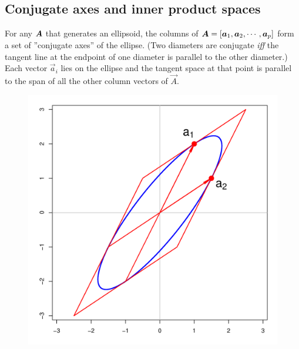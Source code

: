 \subsection{Conjugate axes and inner product spaces}\label{sec:conjugate}

For any $\bm{A}$ that generates an ellipsoid,
the columns of  
$\bm{A}=\left[ 
   \bm{a}_{1}, \bm{a}_{2}, \cdots, \bm{a}_{p}  \\
\right]
$
form a set of ''conjugate axes'' of the ellipse. (Two diameters are conjugate \emph{iff}
the tangent line at the endpoint of one diameter is parallel to the other diameter.)
Each vector 
$\vec{a}_{i}$
lies on the ellipse and the tangent space at that point is parallel to the span of all the other column vectors of 
$\vec{A}$.

\begin{figure}[htb]
 \begin{minipage}[b]{.49\linewidth}
  \centering
  \includegraphics[width=1\linewidth]{fig/conjugate1}
 \end{minipage}%
 \hfill
 \begin{minipage}[b]{.49\linewidth}
  \centering

\end{minipage}
\end{figure}
